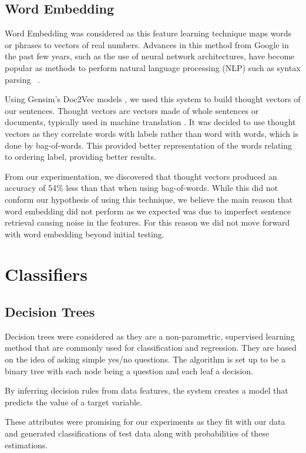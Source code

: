 \documentclass[bsc,frontabs,twoside,singlespacing,parskip,deptreport]{infthesis}     %
\begin{document}
\subsection{Word Embedding}\label{sec:word-embedding}
Word Embedding was considered as this feature learning technique maps words or phrases to vectors of real numbers.
Advances in this method from Google in the past few years, such as the use of neural network architectures, have become
popular as methods to perform natural language processing (NLP) such as syntax parsing ~\cite{socher2013parsing}.

Using Gensim's Doc2Vec models \cite{rehurek_lrec}, we used this system to build thought vectors of our sentences.
Thought vectors are vectors made of whole sentences or documents, typically used in machine translation \cite{deeplearning4j}.
It was decided to use thought vectors as they correlate words with labels rather than word with words, which is done by bag-of-words.
This provided better representation of the words relating to ordering label, providing better results.



From our experimentation, we discovered that thought vectors produced an accuracy of 54\% less than that when
using bag-of-words. While this did not conform our hypothesis of using this technique, we believe 
the main reason that word embedding did not perform as we expected was due to imperfect sentence retrieval causing noise in
the features. For this reason we did not move forward with word embedding beyond initial testing.

\section{Classifiers}\label{sec:classifiers}
\subsection{Decision Trees}
Decision trees were considered as they are a non-parametric, supervised learning method that are commonly used for
classification and regression.
They are based on the idea of asking simple yes/no questions. The algorithm is set up to be a binary tree with
each node being a question and each leaf a decision.

By inferring decision rules from data features, the system creates a model that predicts the value of a target variable.

These attributes were promising for our experiments as they fit with our data and generated
classifications of test data along with probabilities of these estimations.
\end{document}
